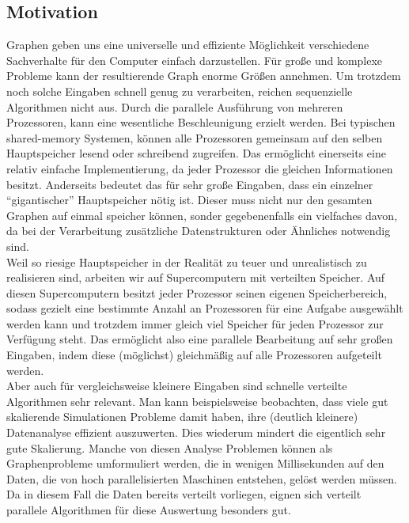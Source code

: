 \subsection{Motivation}
Graphen geben uns eine universelle und effiziente Möglichkeit verschiedene Sachverhalte für den Computer einfach darzustellen. Für große und komplexe Probleme kann der resultierende Graph enorme Größen annehmen. Um trotzdem noch solche Eingaben schnell genug zu verarbeiten, reichen sequenzielle Algorithmen nicht aus. Durch die parallele Ausführung von mehreren Prozessoren, kann eine wesentliche Beschleunigung erzielt werden. Bei typischen shared-memory Systemen, können alle Prozessoren gemeinsam auf den selben Hauptspeicher lesend oder schreibend zugreifen. Das ermöglicht einerseits eine relativ einfache Implementierung, da jeder Prozessor die gleichen Informationen besitzt. Anderseits bedeutet das für sehr große Eingaben, dass ein einzelner \enquote{gigantischer} Hauptspeicher nötig ist. Dieser muss nicht nur den gesamten Graphen auf einmal speicher können, sonder gegebenenfalls ein vielfaches davon, da bei der Verarbeitung zusätzliche Datenstrukturen oder Ähnliches notwendig sind. \\
Weil so riesige Hauptspeicher in der Realität zu teuer und unrealistisch zu realisieren sind, arbeiten wir auf Supercomputern mit verteilten Speicher. Auf diesen Supercomputern besitzt jeder Prozessor seinen eigenen Speicherbereich, sodass gezielt eine bestimmte Anzahl an Prozessoren für eine Aufgabe ausgewählt werden kann und trotzdem immer gleich viel Speicher für jeden Prozessor zur Verfügung steht.
Das ermöglicht also eine parallele Bearbeitung auf sehr großen Eingaben, indem diese (möglichst) gleichmäßig auf alle Prozessoren aufgeteilt werden. \\
Aber auch für vergleichsweise kleinere Eingaben sind schnelle verteilte Algorithmen sehr relevant. Man kann beispielsweise beobachten, dass viele gut skalierende Simulationen Probleme damit haben, ihre (deutlich kleinere) Datenanalyse effizient auszuwerten. Dies wiederum mindert die eigentlich sehr gute Skalierung.
Manche von diesen Analyse Problemen können als Graphenprobleme umformuliert werden, die in wenigen Millisekunden auf den Daten, die von hoch parallelisierten Maschinen entstehen, gelöst werden müssen. Da in diesem Fall die Daten bereits verteilt vorliegen, eignen sich verteilt parallele Algorithmen für diese Auswertung besonders gut.


